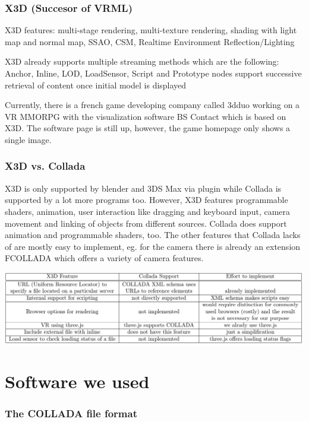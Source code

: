 \documentclass[%
aip,
jmp,
amsmath,amssymb,
reprint,
nofootinbib
]{revtex4-1}
\begin{document}
	\subsubsection{X3D (Succesor of VRML)}
	
	X3D features: multi-stage rendering, multi-texture rendering, shading with light map and normal map, SSAO, CSM, Realtime Environment Reflection/Lighting
	
	X3D already supports multiple streaming methods which are the following: Anchor, Inline, LOD, LoadSensor, Script and Prototype nodes support successive retrieval of content once initial model is displayed
	
	Currently, there is a french game developing company called 3dduo working on a VR MMORPG with the visualization software BS Contact which is based on X3D. The software page is still up, however, the game homepage only shows a single image.
	
	\subsubsection{X3D vs. Collada}
	
	X3D is only supported by blender and 3DS Max via plugin while Collada is supported by a lot more programs too. However, X3D features programmable shaders, animation, user interaction like dragging and keyboard input, camera movement and linking of objects from different sources. Collada does support animation and programmable shaders, too. The other features that Collada lacks of are mostly easy to implement, eg. for the camera there is already an extension FCOLLADA which offers a variety of camera features.
	
	\includegraphics[width=\linewidth]{images/Comparison}
	
	\section{Software we used}
	\subsubsection{The COLLADA file format}
	
\end{document}
